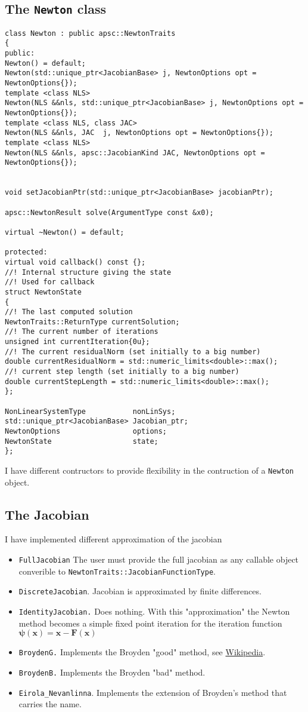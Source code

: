 \documentclass{article}
\newcommand{\li}{\lstinline}
\newcommand{\cpp}[1]{\li!#1!}
\begin{document}
\subsection{The \cpp{Newton} class}
\begin{lstlisting}
class Newton : public apsc::NewtonTraits
{
public:
Newton() = default;
Newton(std::unique_ptr<JacobianBase> j, NewtonOptions opt = NewtonOptions{});
template <class NLS>
Newton(NLS &&nls, std::unique_ptr<JacobianBase> j, NewtonOptions opt = NewtonOptions{});
template <class NLS, class JAC>
Newton(NLS &&nls, JAC  j, NewtonOptions opt = NewtonOptions{});
template <class NLS>
Newton(NLS &&nls, apsc::JacobianKind JAC, NewtonOptions opt = NewtonOptions{});


void setJacobianPtr(std::unique_ptr<JacobianBase> jacobianPtr);

apsc::NewtonResult solve(ArgumentType const &x0);

virtual ~Newton() = default;

protected:
virtual void callback() const {};
//! Internal structure giving the state
//! Used for callback
struct NewtonState
{
//! The last computed solution
NewtonTraits::ReturnType currentSolution;
//! The current number of iterations
unsigned int currentIteration{0u};
//! The current residualNorm (set initially to a big number)
double currentResidualNorm = std::numeric_limits<double>::max();
//! current step length (set initially to a big number)
double currentStepLength = std::numeric_limits<double>::max();
};

NonLinearSystemType           nonLinSys;
std::unique_ptr<JacobianBase> Jacobian_ptr;
NewtonOptions                 options;
NewtonState                   state;
};

\end{lstlisting}

I have different contructors to provide flexibility in the contruction of a \cpp{Newton} object.
\subsection{The Jacobian}
I have implemented different approximation of the jacobian
\begin{itemize}
    \item \cpp{FullJacobian} The user must provide the full jacobian as any callable object converible to
    \cpp{NewtonTraits::JacobianFunctionType}.
    \item \cpp{DiscreteJacobian}. Jacobian is approximated by finite differences.
    \item \cpp{IdentityJacobian.} Does nothing. With this "approximation" the Newton method becomes a simple fixed point iteration 
    for the iteration function $\boldsymbol{\psi}(\mathbf{x})=\mathbf{x}-\mathbf{F}(\mathbf{x})$
     \item \cpp{BroydenG.} Implements the Broyden "good" method, see \href{https://en.wikipedia.org/wiki/Broyden%27s_method}{Wikipedia}.%
   \item \cpp{BroydenB.} Implements the Broyden "bad" method.
   \item  \cpp{Eirola_Nevanlinna}. Implements the extension of Broyden's method that carries the name.   
\end{itemize}
\end{document}
